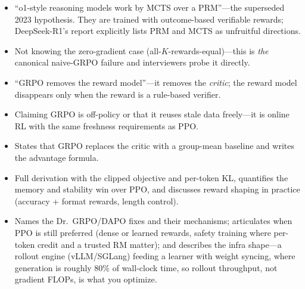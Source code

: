 \begin{interviewq}
\redflags
\begin{itemize}
    \item ``o1-style reasoning models work by MCTS over a PRM''---the superseded 2023 hypothesis. They are trained with outcome-based verifiable rewards; DeepSeek-R1's report explicitly lists PRM and MCTS as unfruitful directions.
    \item Not knowing the zero-gradient case (all-$K$-rewards-equal)---this is \textit{the} canonical naive-GRPO failure and interviewers probe it directly.
    \item ``GRPO removes the reward model''---it removes the \textit{critic}; the reward model disappears only when the reward is a rule-based verifier.
    \item Claiming GRPO is off-policy or that it reuses stale data freely---it is online RL with the same freshness requirements as PPO.
\end{itemize}


\goodgreat
\begin{itemize}
    \item {} States that GRPO replaces the critic with a group-mean baseline and writes the advantage formula.
    \item {} Full derivation with the clipped objective and per-token KL, quantifies the memory and stability win over PPO, and discusses reward shaping in practice (accuracy + format rewards, length control).
    \item {} Names the Dr.~GRPO/DAPO fixes and their mechanisms; articulates when PPO is still preferred (dense or learned rewards, safety training where per-token credit and a trusted RM matter); and describes the infra shape---a rollout engine (vLLM/SGLang) feeding a learner with weight syncing, where generation is roughly 80\% of wall-clock time, so rollout throughput, not gradient FLOPs, is what you optimize.
\end{itemize}

\end{interviewq}

